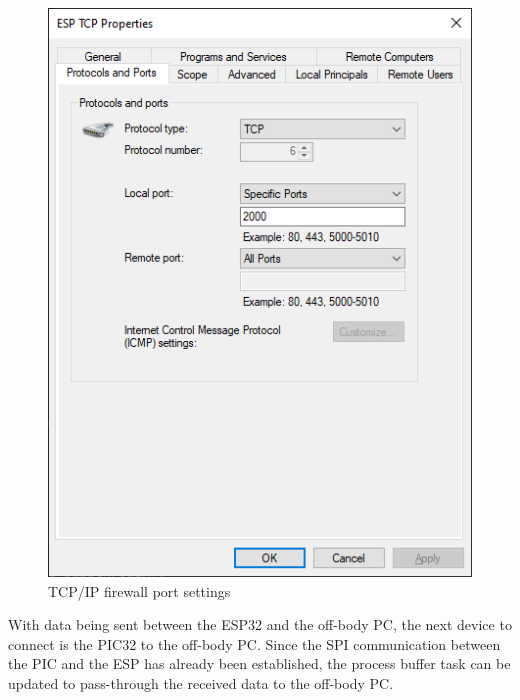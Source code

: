 \begin{figure}[!ht]
  \caption{TCP/IP firewall port settings}\label{fig:firewall}
  \centering
  \includegraphics[width=1\columnwidth/2]{chapters/development/FIREWALL}
\end{figure}

With data being sent between the ESP32 and the off-body PC, the next device to connect is the PIC32 to the off-body PC.
Since the SPI communication between the PIC and the ESP has already been established,
the process buffer task can be updated to pass-through the received data to the off-body PC.

